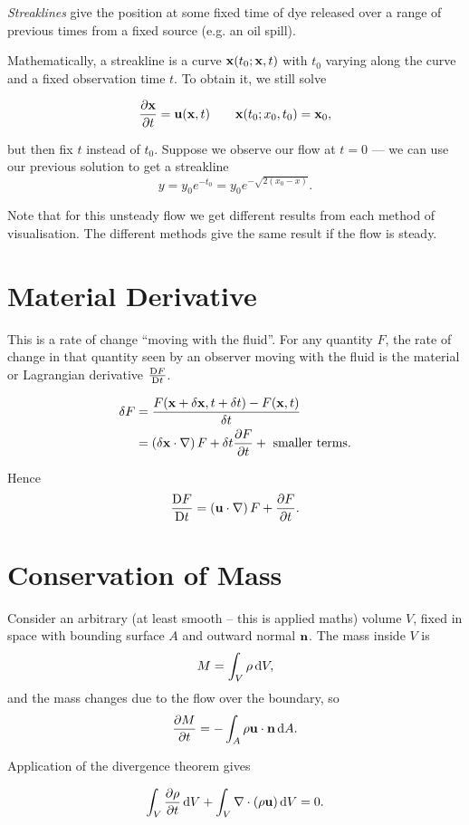 \documentclass{notes}
\newcommand{\matd}[1]{\DDt{#1}}
\newcommand{\divr}{\nabla\cdot}
\newcommand{\dgrad}[2]{\left(#1\cdot\nabla\right)#2}
\begin{document}
\emph{Streaklines} give the position at some fixed time of dye
released over a range of previous times from a fixed source (e.g. an
oil spill).

Mathematically, a streakline is a curve $\mathbf{x}(t_0;\mathbf{x},t)$ with $t_0$
varying along the curve and a fixed observation time $t$.  To obtain
it, we still solve

\[
\frac{\partial \mathbf{x}}{\partial t} = \mathbf{u}(\mathbf{x},t) \qquad \mathbf{x}(t_0;x_0,t_0) = \mathbf{x}_0,
\]

but then fix $t$ instead of $t_0$.  Suppose we observe our flow at $t
= 0$ --- we can use our previous solution to get a streakline
\[
y = y_0 e^{- t_0} = y_0 e^{-\sqrt{2(x_0 - x)}}.
\]

Note that for this unsteady flow we get different results from each
method of visualisation.  The different methods give the same result
if the flow is steady.

\section{Material Derivative}

This is a rate of change ``moving with the fluid''.  For any quantity
$F$, the rate of change in that quantity seen by an observer moving
with the fluid is the material or Lagrangian derivative $\matd{F}$.

\begin{align*}
  \delta F &=
  \frac{F(\vx+\vect{\delta x},t+\delta t) - F(\vx,t)}{\delta t} \\
  &= \dgrad{\vect{\delta x}}{F} + \delta t \pd{F}{t} + \text{ smaller
    terms.}
\end{align*}

Hence
\[
\matd{F} = \dgrad{\vu}{F} + \pd{F}{t}.
\]

\section{Conservation of Mass}

Consider an arbitrary (at least smooth -- this is applied maths)
volume $V$, fixed in space with bounding surface $A$ and outward
normal $\mathbf{n}$.  The mass inside $V$ is
\[
M = \int_V \rho \,\mathrm{d} V,
\]
and the mass changes due to the flow over the boundary, so
\[
\frac{\partial M}{\partial t} = -\int_A \rho \mathbf{u}\cdot\mathbf{n} \,\mathrm{d} A.
\]

Application of the divergence theorem gives

\[
\int_V \pd{\rho}{t} \,\ud V + \int_V \divr{(\rho \vu)} \,\ud V = 0.
\]
\end{document}
